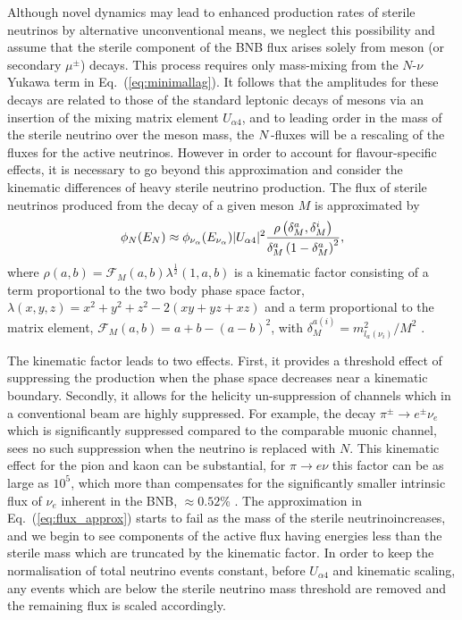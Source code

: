 \documentclass[11pt, a4paper]{article}
\newcommand{\refeq}[1]{Eq.~(\ref{#1})}
\def\ster{\ensuremath N}
\begin{document}
%
Although novel dynamics may lead to enhanced production rates of sterile
neutrinos by alternative unconventional means, we neglect this possibility and
assume that the sterile component of the BNB flux arises solely from meson (or
secondary $\mu^\pm$) decays. This process requires only mass-mixing from the
$N$-$\nu$ Yukawa term in \refeq{eq:minimallag}. It follows that the amplitudes
for these decays are related to those of the standard leptonic decays of mesons
via an insertion of the mixing matrix element $U_{\alpha 4}$, and to leading
order in the mass of the sterile neutrino over the meson mass, the
$\ster$-fluxes will be a rescaling of the fluxes for the active neutrinos. 
%
However in order to account for flavour-specific effects, it is necessary to go
beyond this approximation and consider the kinematic differences of heavy
sterile neutrino production.
%
The flux of sterile neutrinos produced from the decay of a given meson $M$ is
approximated by
%
\begin{equation} \phi_{\ster}(E_{\ster}) \approx \phi_{\nu_\alpha} (E_{\nu_\alpha})\vert
U_{\alpha 4}\vert^2 \frac{\rho\left( \delta_M^a , \delta_M^i
\right)}{\delta_M^a \left(1- \delta_M^a\right)^2}, \label{eq:flux_approx} \end{equation}
%
where $\rho(a,b)=\mathcal{F}_M(a,b) \lambda^{\frac{1}{2}}(1,a,b)$ is a
kinematic factor consisting of a term proportional to the two body phase space
factor, $\lambda(x,y,z)=x^2+y^2+z^2-2(x y+yz+x z)$ and a term proportional to
the matrix element, $\mathcal{F}_M(a,b)= a+b -\left(a-b\right)^2$, with
$\delta_M^{a(i)}=m_{l_a(\nu_i)}^2/M^2$ \cite{PhysRevD.24.1232}. 

The kinematic factor leads to two effects. First, it provides a threshold effect
of suppressing the production when the phase space decreases near a kinematic
boundary.  Secondly, it allows for the helicity un-suppression of channels
which in a conventional beam are highly suppressed. For example, the decay
$\pi^\pm \to e^\pm \nu_e$ which is significantly suppressed compared to the
comparable muonic channel, sees no such suppression when the neutrino is
replaced with $N$.
%
This kinematic effect for the pion and kaon can be substantial, for $\pi
\rightarrow e \nu$ this factor can be as large as $10^5$, which more than
compensates for the significantly smaller intrinsic flux of $\nu_e$ inherent in
the BNB, $\approx 0.52$\% \cite{AguilarArevalo:2008yp}. The approximation in \refeq{eq:flux_approx}
starts to fail as the mass of the sterile neutrinoincreases, and we begin to
see components of the active flux having energies less than the sterile mass
which are truncated by the kinematic factor. In order to keep the normalisation
of total neutrino events constant, before $U_{\alpha 4}$ and kinematic scaling,
any events which are below the sterile neutrino mass threshold are removed and the
remaining flux is scaled accordingly.
\end{document}
